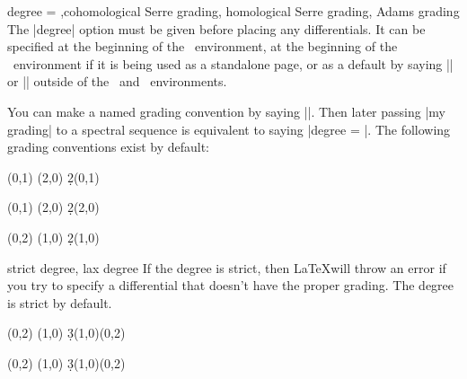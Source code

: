 \begin{sseqdata}[name = basic, cohomological Serre grading]
\begin{keylist}{degree = ,cohomological Serre grading, homological Serre grading, Adams grading}
The |degree| option must be given before placing any differentials. It can be specified at the beginning of the \sseqdataenv\  environment, at the beginning of the \sseqpageenv\  environment if it is being used as a standalone page, or as a default by saying || or || outside of the \sseqdataenv\  and \sseqpages\  environments.

You can make a named grading convention by saying \codeverb||. Then later passing |my grading| to a spectral sequence is equivalent to saying |degree = |. The following grading conventions exist by default:
\begin{codeexample}[width = 6cm]
\begin{sseqpage}
\class(0,1)
\class(2,0)
\d2(0,1)
\end{sseqpage}
\end{codeexample}
\begin{codeexample}[width = 6cm]
\begin{sseqpage}
\class(0,1)
\class(2,0)
\d2(2,0)
\end{sseqpage}
\end{codeexample}
\begin{codeexample}[width = 6cm]
\begin{sseqpage}
\class(0,2)
\class(1,0)
\d2(1,0)
\end{sseqpage}
\end{codeexample}
\end{keylist}

\begin{keylist}{strict degree, lax degree}
If the degree is strict, then \LaTeX will throw an error if you try to specify a differential that doesn't have the proper grading. The degree is strict by default.
\begin{codeexample}
\begin{sseqdata}[ name = laxdegree, Adams grading ]
\class(0,2)
\class(1,0)
\d3(1,0)(0,2) %
\end{sseqdata}
\end{codeexample}

\begin{codeexample}[]
\begin{sseqdata}[ name = laxdegree, Adams grading, lax degree, yscale = 0.6 ]
\class(0,2)
\class(1,0)
\d3(1,0)(0,2) %
\end{sseqdata}
\printpage[ name = laxdegree, page = 3 ]
\end{codeexample}
\end{keylist}


\end{sseqdata}
